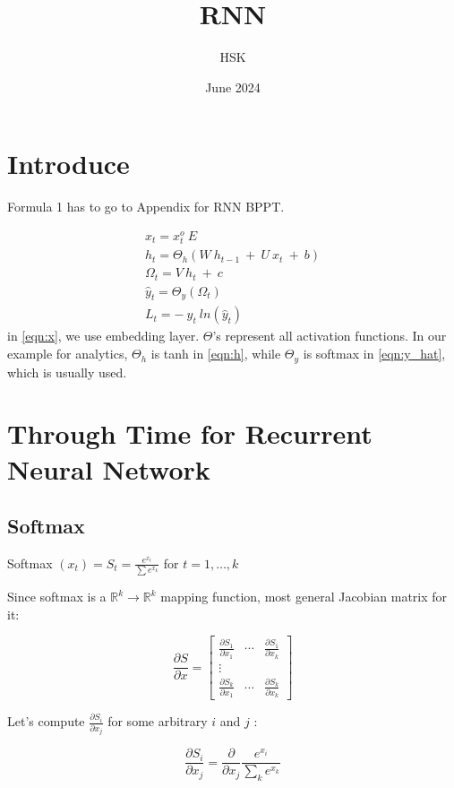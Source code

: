 \documentclass{article}
\title{RNN}
\author{HSK}
\date{June 2024}
\begin{document}
\maketitle
\section{Introduce}

Formula 1 has to go to Appendix for RNN BPPT.

\begin{eqnarray}
\label{eqn:x}
	x_t = x^o_t ~ E\\
\label{eqn:h}
	h_t = \Theta_h(W ~h_{t-1}~+~U~x_t ~+~b)\\
\label{eqn:omega}
        \Omega_t = V ~h_{t}~+~c \\
\label{eqn:y_hat}
        \hat{y}_t = \Theta_y(\Omega_t)\\
\label{eqn:Loss}
        L_t = -~y_t~ln(\hat{y}_t)
\end{eqnarray}
in \eqref{eqn:x}, we use embedding layer.
$\Theta$'s represent all activation functions. In our example for analytics, $\Theta_h$ is tanh in \eqref{eqn:h}, while $\Theta_y$ is softmax in \eqref{eqn:y_hat}, which is usually used.

\section{Through Time for Recurrent Neural Network}
\subsection{Softmax}
Softmax $\left(x_{t}\right)=S_{t}=\frac{e^{x_{t}}}{\sum e^{x_{k}}}$ for $t=1, \ldots, k$

Since softmax is a $\mathbb{R}^{k} \rightarrow \mathbb{R}^{k}$ mapping function, most general Jacobian matrix for it:

$$
\frac{\partial S}{\partial x}=\left[\begin{array}{ccc}
\frac{\partial S_{1}}{\partial x_{1}} & \cdots & \frac{\partial S_{1}}{\partial x_{k}} \\
\vdots & & \\
\frac{\partial S_{k}}{\partial x_{1}} & \cdots & \frac{\partial S_{k}}{\partial x_{k}}
\end{array}\right]
$$

Let's compute $\frac{\partial S_{i}}{\partial x_{j}}$ for some arbitrary $i$ and $j$ :

$$
\frac{\partial S_{i}}{\partial x_{j}}=\frac{\partial}{\partial x_{j}} \frac{e^{x_{i}}}{\sum_{k} e^{x_{k}}}
$$
\end{document}
